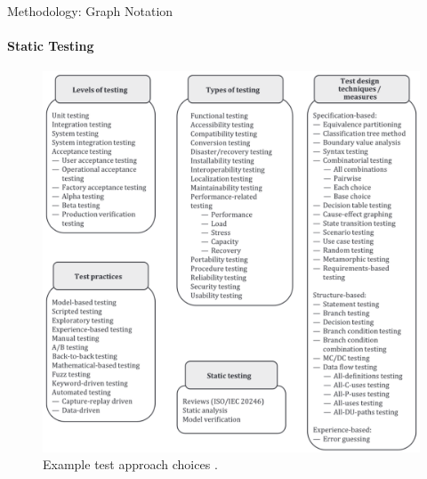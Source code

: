 \documentclass{beamer}
\begin{document}
\begin{frame}[t]{Methodology: Graph Notation}
    \framesubtitle{Static Testing}
    \begin{figure}
        \centering
        \includegraphics[height=0.65\textheight]{assets/images/test approach choices}
        \caption{Example test approach choices \citep[Fig.~2]{IEEE2022}.}
    \end{figure}
\end{frame}
\end{document}
